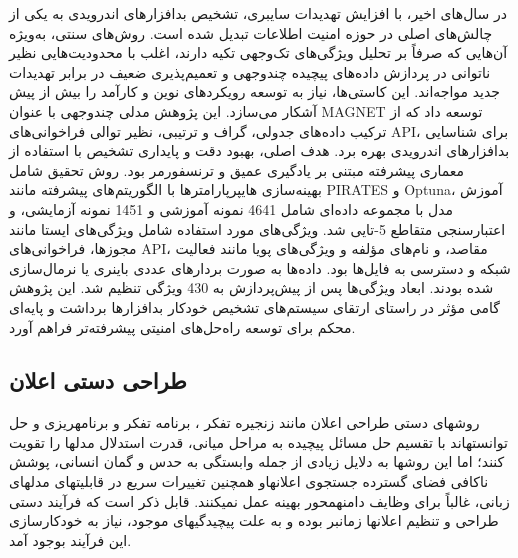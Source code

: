 در سال‌های اخیر، با افزایش تهدیدات سایبری، تشخیص بدافزارهای اندرویدی به یکی از چالش‌های اصلی در حوزه امنیت اطلاعات تبدیل شده است. روش‌های سنتی، به‌ویژه آن‌هایی که صرفاً بر تحلیل ویژگی‌های تک‌وجهی تکیه دارند، اغلب با محدودیت‌هایی نظیر ناتوانی در پردازش داده‌های پیچیده چندوجهی و تعمیم‌پذیری ضعیف در برابر تهدیدات جدید مواجه‌اند. این کاستی‌ها، نیاز به توسعه رویکردهای نوین و کارآمد را بیش از پیش آشکار می‌سازد. این پژوهش مدلی چندوجهی با عنوان MAGNET توسعه داد که از ترکیب داده‌های جدولی، گراف و ترتیبی، نظیر توالی فراخوانی‌های API، برای شناسایی بدافزارهای اندرویدی بهره برد. هدف اصلی، بهبود دقت و پایداری تشخیص با استفاده از معماری پیشرفته مبتنی بر یادگیری عمیق و ترنسفورمر بود. روش تحقیق شامل بهینه‌سازی هایپرپارامترها با الگوریتم‌های پیشرفته مانند PIRATES و Optuna، آموزش مدل با مجموعه داده‌ای شامل 4641 نمونه آموزشی و 1451 نمونه آزمایشی، و اعتبارسنجی متقاطع 5-تایی شد. ویژگی‌های مورد استفاده شامل ویژگی‌های ایستا مانند مجوزها، فراخوانی‌های API، مقاصد، و نام‌های مؤلفه و ویژگی‌های پویا مانند فعالیت شبکه و دسترسی به فایل‌ها بود. داده‌ها به صورت بردارهای عددی باینری یا نرمال‌سازی شده بودند. ابعاد ویژگی‌ها پس از پیش‌پردازش به 430 ویژگی تنظیم شد. این پژوهش گامی مؤثر در راستای ارتقای سیستم‌های تشخیص خودکار بدافزارها برداشت و پایه‌ای محکم برای توسعه راه‌حل‌های امنیتی پیشرفته‌تر فراهم آورد.

\subsection{طراحی دستی اعلان}
روش\/های دستی طراحی اعلان مانند
 زنجیره تفکر \cite{CoT}
 ، 
 برنامه تفکر \cite{PoT} 
 و
 برنامه\/ریزی و حل \cite{PS}
 توانسته\/اند با تقسیم حل مسائل پیچیده به مراحل میانی، قدرت استدلال مدل\/ها را تقویت کنند؛ اما این روش\/ها به دلایل زیادی از جمله وابستگی به حدس و گمان انسانی، پوشش ناکافی فضای گسترده جستجوی اعلان\/هاو همچنین تغییرات سریع در قابلیت\/های مدل\/های زبانی، غالباً برای وظایف دامنه\/محور بهینه عمل نمی\/کنند. قابل ذکر است که فرآیند دستی طراحی و تنظیم اعلان\/ها زمان\/بر بوده و به علت پیچیدگی\/های موجود، نیاز به خودکارسازی این فرآیند بوجود آمد.

